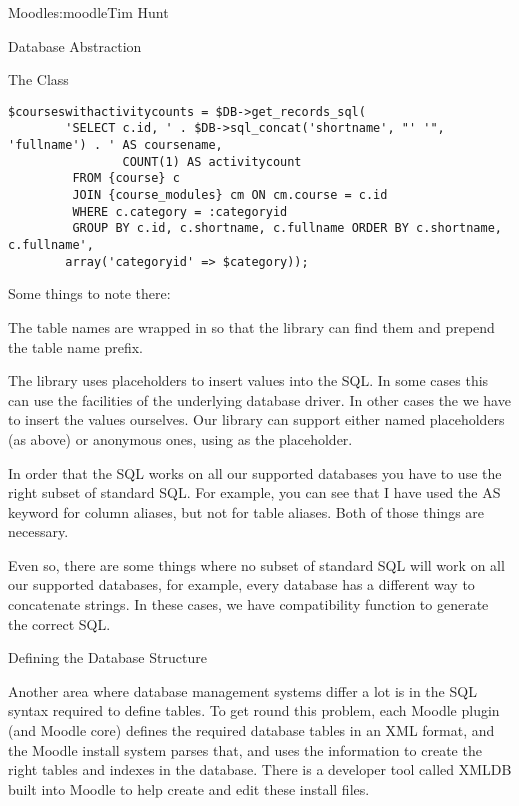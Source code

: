 \begin{aosachapter}{Moodle}{s:moodle}{Tim Hunt}
\begin{aosasect1}{Database Abstraction}
\begin{aosasect2}{The  Class}
\begin{verbatim}
$courseswithactivitycounts = $DB->get_records_sql(
        'SELECT c.id, ' . $DB->sql_concat('shortname', "' '", 'fullname') . ' AS coursename,
                COUNT(1) AS activitycount
         FROM {course} c
         JOIN {course_modules} cm ON cm.course = c.id
         WHERE c.category = :categoryid
         GROUP BY c.id, c.shortname, c.fullname ORDER BY c.shortname, c.fullname',
        array('categoryid' => $category));
\end{verbatim}

\noindent
Some things to note there:

\begin{aosaenumerate}

\item The table names are wrapped in \code{\{\}} so that the library
  can find them and prepend the table name prefix.

\item The library uses placeholders to insert values into the SQL. In
  some cases this can use the facilities of the underlying database
  driver. In other cases the we have to insert the values
  ourselves. Our library can support either named placeholders (as
  above) or anonymous ones, using  as the placeholder.

\item In order that the SQL works on all our supported databases you
  have to use the right subset of standard SQL. For example, you can
  see that I have used the AS keyword for column aliases, but not for
  table aliases. Both of those things are necessary.

\item Even so, there are some things where no subset of standard SQL
  will work on all our supported databases, for example, every
  database has a different way to concatenate strings. In these cases,
  we have compatibility function to generate the correct SQL.

\end{aosaenumerate}

\end{aosasect2}

\begin{aosasect2}{Defining the Database Structure}

Another area where database management systems differ a lot is in the
SQL syntax required to define tables. To get round this problem, each
Moodle plugin (and Moodle core) defines the required database tables
in an XML format, and the Moodle install system parses that, and uses
the information to create the right tables and indexes in the
database. There is a developer tool called XMLDB built into Moodle to
help create and edit these install files.


\end{aosasect2}
\end{aosasect1}
\end{aosachapter}

